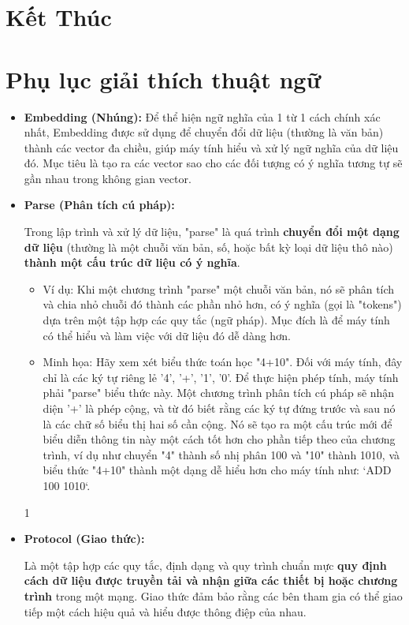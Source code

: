 \documentclass[11pt]{article}
\begin{document}
\section{Kết Thúc}

\clearpage
\appendix
\section{Phụ lục giải thích thuật ngữ} \label{app:glossary}
\begin{itemize}
	\item \textbf{Embedding (Nhúng):} \label{app:embedding} Để thể hiện ngữ nghĩa của 1 từ 1 cách chính xác nhất, Embedding được sử dụng để chuyển đổi dữ liệu (thường là văn bản) thành các vector đa chiều, giúp máy tính hiểu và xử lý ngữ nghĩa của dữ liệu đó. Mục tiêu là tạo ra các vector sao cho các đối tượng có ý nghĩa tương tự sẽ gần nhau trong không gian vector.
	
    \item \textbf{Parse (Phân tích cú pháp):} \label{app:parse}
    \begin{boxC}
        Trong lập trình và xử lý dữ liệu, "parse" là quá trình \textbf{chuyển đổi một dạng dữ liệu} (thường là một chuỗi văn bản, số, hoặc bất kỳ loại dữ liệu thô nào) \textbf{thành một cấu trúc dữ liệu có ý nghĩa}.
        \begin{itemize}
            \item Ví dụ: Khi một chương trình "parse" một chuỗi văn bản, nó sẽ phân tích và chia nhỏ chuỗi đó thành các phần nhỏ hơn, có ý nghĩa (gọi là "tokens") dựa trên một tập hợp các quy tắc (ngữ pháp). Mục đích là để máy tính có thể hiểu và làm việc với dữ liệu đó dễ dàng hơn.
            \item Minh họa: Hãy xem xét biểu thức toán học "4+10". Đối với máy tính, đây chỉ là các ký tự riêng lẻ '4', '+', '1', '0'. Để thực hiện phép tính, máy tính phải "parse" biểu thức này. Một chương trình phân tích cú pháp sẽ nhận diện '+' là phép cộng, và từ đó biết rằng các ký tự đứng trước và sau nó là các chữ số biểu thị hai số cần cộng. Nó sẽ tạo ra một cấu trúc mới để biểu diễn thông tin này một cách tốt hơn cho phần tiếp theo của chương trình, ví dụ như chuyển "4" thành số nhị phân 100 và "10" thành 1010, và biểu thức "4+10" thành một dạng dễ hiểu hơn cho máy tính như: `ADD 100 1010`.
        \end{itemize}
    \end{boxC}
1
    \item \textbf{Protocol (Giao thức):} \label{app:protocol}
    \begin{boxC}
        Là một tập hợp các quy tắc, định dạng và quy trình chuẩn mực \textbf{quy định cách dữ liệu được truyền tải và nhận giữa các thiết bị hoặc chương trình} trong một mạng. Giao thức đảm bảo rằng các bên tham gia có thể giao tiếp một cách hiệu quả và hiểu được thông điệp của nhau.
    \end{boxC}


\end{itemize}
\end{document}
